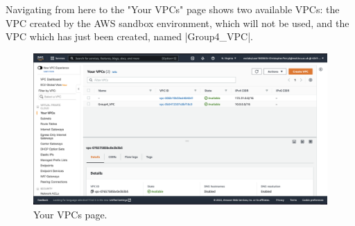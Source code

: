 Navigating from here to the "Your VPCs" page shows two available VPCs: the VPC created by the AWS sandbox
environment, which will not be used, and the VPC which has just been created, named |Group4_VPC|.

\begin{figure}[!htbp]
    \centering
    \includegraphics[width=\textwidth]{resources/vpc/your_vpcs}
    \caption{Your VPCs page.}
    \label{fig:vpc-step-5}
\end{figure}
